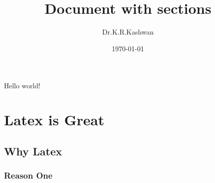 \documentclass{article}
\title{Document with sections}
\author{Dr.K.R.Kashwan}
\date{\today}
\begin{document}
\maketitle
Hello world!
	\section{Latex is Great}
	\subsection{Why Latex}
	\subsubsection{Reason One}
\end{document}
